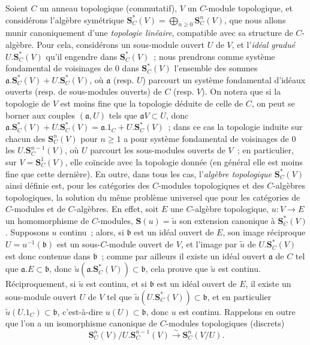 \begin{env}[19.5.1]
\label{0.19.5.1-fr}
Soient $C$ un anneau topologique (commutatif), $V$ un $C$-module topologique,
et considérons l'algèbre symétrique
$\mathbf S_C^*(V)=\bigoplus_{n\geq0}\mathbf S_C^n(V)$, que nous allons munir
canoniquement d'une \emph{topologie linéaire}, compatible avec sa structure de
$C$-algèbre. Pour cela, considérons un sous-module ouvert $U$ de $V$, et
l'\emph{idéal gradué} $U.\mathbf S_C^*(V)$ qu'il engendre dans
$\mathbf S_C^*(V)$~; nous prendrons comme système fondamental de voisinages de
$0$ dans $\mathbf S_C^*(V)$ l'ensemble des sommes
$\mathfrak a.\mathbf S_C^*(V)+U.\mathbf S_C^*(V)$, où $\mathfrak a$ (resp.
$U$) parcourt un système fondamental d'idéaux ouverts (resp. de sous-modules
ouverts) de $C$ (resp. $V$). On notera que si la topologie de $V$ est moins
fine que la topologie déduite de celle de $C$, on peut se borner aux couples
$(\mathfrak a,U)$ tels que $\mathfrak aV\subset U$, donc
$\mathfrak a.\mathbf S_C^*(V)+U.\mathbf S_C^*(V)
=\mathfrak a.1_C+U.\mathbf S_C^*(V)$~; dans ce cas la topologie induite sur
chacun des $\mathbf S_C^n(V)$ pour $n\geq1$ a pour système fondamental de
voisinages de $0$ les $U.\mathbf S_C^{n-1}(V)$, où $U$ parcourt les
sous-modules ouverts de $V$~; en particulier, sur $V=\mathbf S_C^1(V)$, elle
coïncide avec la topologie donnée (en général elle est moins fine que cette
dernière). En outre, dans tous les cas, l'\emph{algèbre topologique}
$\mathbf S_C^*(V)$ ainsi définie est, pour les catégories des $C$-modules
topologiques et des $C$-algèbres topologiques, la solution du même problème
universel que pour les catégories de $C$-modules et de $C$-algèbres. En effet,
soit $E$ une $C$-algèbre topologique, $u:V\to E$ un homomorphisme de
$C$-modules, $\mathbf S(u)=\widetilde u$ son extension canonique à
$\mathbf S_C^*(V)$. Supposons $u$ continu~; alors, si $\mathfrak b$ est un
idéal ouvert de $E$, son image réciproque $U=u^{-1}(\mathfrak b)$ est un
sous-$C$-module ouvert de $V$, et l'image par $\widetilde u$ de
$U.\mathbf S_C^*(V)$ est donc contenue dans $\mathfrak b$~; comme par ailleurs
il existe un idéal ouvert $\mathfrak a$ de $C$ tel que
$\mathfrak a.E\subset\mathfrak b$, donc
$\widetilde u(\mathfrak a.\mathbf S_C^*(V))\subset\mathfrak b$, cela prouve
que $\widetilde u$ est continu. Réciproquement, si $\widetilde u$ est continu,
et si $\mathfrak b$ est un idéal ouvert de $E$, il existe un sous-module ouvert
$U$ de $V$ tel que $\widetilde u(U.\mathbf S_C^*(V))\subset\mathfrak b$, et en
particulier $\widetilde u(U.1_C)\subset\mathfrak b$, c'est-à-dire
$u(U)\subset\mathfrak b$, donc $u$ est continu. Rappelons en outre que l'on a
un isomorphisme canonique de $C$-modules topologiques (discrets)
\begin{equation}
\label{0.19.5.1.1-fr}
  \mathbf S_C^n(V)/U.\mathbf S_C^{n-1}(V)
  \xrightarrow{\sim}\mathbf S_C^n(V/U).
  \tag{19.5.1.1}
\end{equation}
\end{env}


